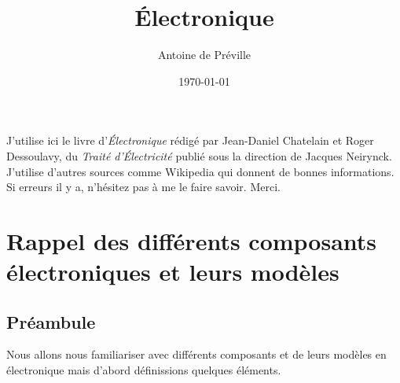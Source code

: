 \documentclass{book}
\title{Électronique}
\author{Antoine de Préville}
\date{\today}
\begin{document}
\maketitle
\tableofcontents
\newpage
J'utilise ici le livre d'\textit{Électronique} rédigé par Jean-Daniel Chatelain et Roger Dessoulavy, du \textit{Traité d'Électricité} publié sous la direction de Jacques Neirynck. J'utilise d'autres sources comme Wikipedia qui donnent de bonnes informations. Si erreurs il y a, n'hésitez pas à me le faire savoir. Merci.

    \chapter{Rappel des différents composants électroniques et leurs modèles}

        \section{Préambule}
        Nous allons nous familiariser avec différents composants et de leurs modèles en électronique mais d'abord définissions quelques éléments.
\end{document}
